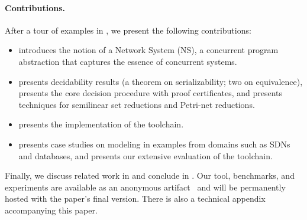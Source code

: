 \paragraph{Contributions.}
After a tour of examples in , we present the following contributions:
\begin{itemize}
    \item {} introduces the notion of a Network System (NS), a concurrent program abstraction that captures the essence of concurrent systems.
    \item {} presents decidability results (a theorem on serializability; two on equivalence), presents the core decision procedure with proof certificates, and presents techniques for semilinear set reductions and Petri-net reductions.
    \item {} presents the implementation of the \toolname{} toolchain.
    \item {} presents case studies on modeling in \toolname{} examples from domains such as SDNs and databases, and presents our extensive evaluation of the toolchain.
\end{itemize}


Finally, we discuss related work in  and conclude in .
Our tool, benchmarks, and experiments are available as an anonymous artifact~\cite{ArtifactRepository} and will be permanently hosted with the paper’s final version. There is also a technical appendix accompanying this paper.